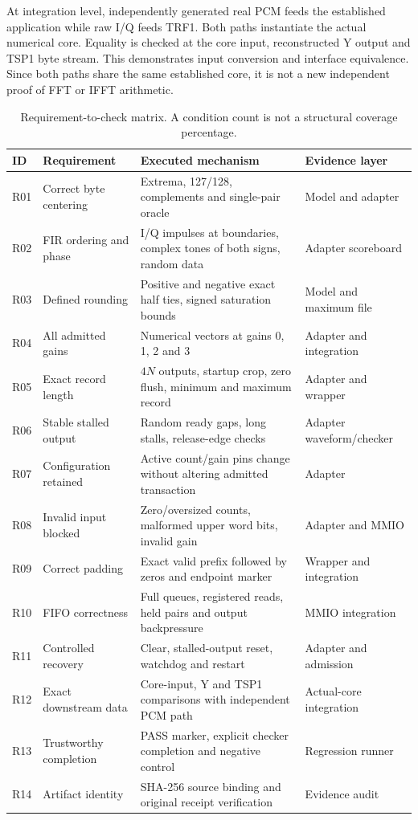 \documentclass[11pt,letterpaper]{article}
\begin{document}
At integration level, independently generated real PCM feeds the established application while raw I/Q feeds TRF1. Both paths instantiate the actual numerical core. Equality is checked at the core input, reconstructed Y output and TSP1 byte stream. This demonstrates input conversion and interface equivalence. Since both paths share the same established core, it is not a new independent proof of FFT or IFFT arithmetic.

\begin{table}[H]\centering\footnotesize
\caption{Requirement-to-check matrix. A condition count is not a structural coverage percentage.}
\renewcommand{\arraystretch}{1.17}
\begin{tabularx}{\linewidth}{@{}p{0.45in}p{1.45in}Y >{\raggedright\arraybackslash}p{1.2in}@{}}\toprule
ID & Requirement & Executed mechanism & Evidence layer \\ \midrule
R01 & Correct byte centering & Extrema, 127/128, complements and single-pair oracle & Model and adapter \\
R02 & FIR ordering and phase & I/Q impulses at boundaries, complex tones of both signs, random data & Adapter scoreboard \\
R03 & Defined rounding & Positive and negative exact half ties, signed saturation bounds & Model and maximum file \\
R04 & All admitted gains & Numerical vectors at gains 0, 1, 2 and 3 & Adapter and integration \\
R05 & Exact record length & $4N$ outputs, startup crop, zero flush, minimum and maximum record & Adapter and wrapper \\
R06 & Stable stalled output & Random ready gaps, long stalls, release-edge checks & Adapter waveform/checker \\
R07 & Configuration retained & Active count/gain pins change without altering admitted transaction & Adapter \\
R08 & Invalid input blocked & Zero/oversized counts, malformed upper word bits, invalid gain & Adapter and MMIO \\
R09 & Correct padding & Exact valid prefix followed by zeros and endpoint marker & Wrapper and integration \\
R10 & FIFO correctness & Full queues, registered reads, held pairs and output backpressure & MMIO integration \\
R11 & Controlled recovery & Clear, stalled-output reset, watchdog and restart & Adapter and admission \\
R12 & Exact downstream data & Core-input, Y and TSP1 comparisons with independent PCM path & Actual-core integration \\
R13 & Trustworthy completion & PASS marker, explicit checker completion and negative control & Regression runner \\
R14 & Artifact identity & SHA-256 source binding and original receipt verification & Evidence audit \\
\bottomrule\end{tabularx}
\end{table}
\end{document}
